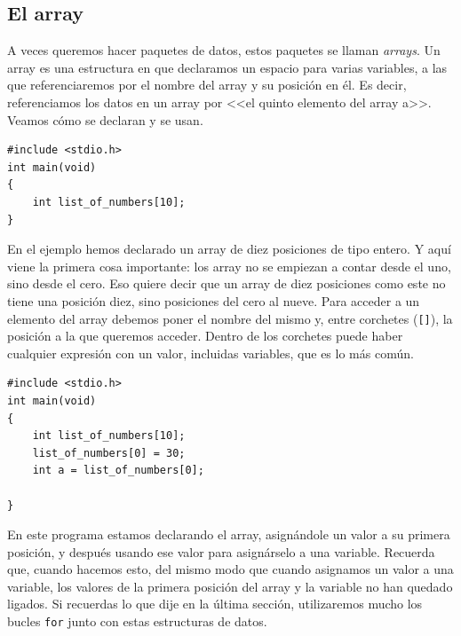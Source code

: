 \documentclass[a4paper]{article}
\begin{document}
\subsection{El array}
A veces queremos hacer paquetes de datos, estos paquetes se llaman
\textit{arrays}. Un array es
una estructura en que declaramos un espacio para varias variables, a las que
referenciaremos por el nombre del array y su posición en él. Es decir,
referenciamos los datos en un array por <<el quinto elemento del array a>>.
Veamos cómo se declaran y se usan.


\noindent
\begin{minipage}[H]{\linewidth}
\mbox{}
\begin{lstlisting}[style=C,
caption={Ejemplo de declaración de array},
label={lst:arrayDeclaration}]
#include <stdio.h>
int main(void)
{
    int list_of_numbers[10];
}
\end{lstlisting}
\end{minipage}


En el ejemplo hemos declarado un array de diez posiciones de tipo entero. Y aquí
viene la primera cosa importante: los array no se empiezan a contar desde el
uno, sino desde el cero. Eso quiere decir que un array de diez posiciones
como este no tiene una posición diez, sino posiciones del cero al nueve.
Para acceder a un elemento
del array debemos poner el nombre del mismo y, entre corchetes (\verb![]!), la
posición a la que queremos acceder. Dentro de los corchetes puede haber
cualquier expresión con un valor, incluidas variables, que es lo más común.


\noindent
\begin{minipage}[H]{\linewidth}
\mbox{}
\begin{lstlisting}[style=C,
caption={Ejemplo de uso de array},
label={lst:arrayUse}]
#include <stdio.h>
int main(void)
{
    int list_of_numbers[10];
    list_of_numbers[0] = 30;
    int a = list_of_numbers[0];

}
\end{lstlisting}
\end{minipage}


En este programa estamos declarando el array, asignándole un valor a su primera
posición, y después usando ese valor para asignárselo a una variable. Recuerda
que, cuando hacemos esto, del mismo modo que cuando asignamos un valor a una
variable, los valores de la primera posición del array y la variable no han
quedado ligados. Si recuerdas lo que dije en la última sección, utilizaremos
mucho los bucles \texttt{for} junto con estas estructuras de datos.
\end{document}
